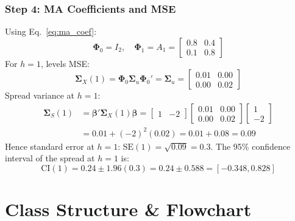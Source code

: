 \documentclass[10pt,a4paper,twocolumn]{article}
\newcommand{\bbeta}{\boldsymbol{\beta}}
\newcommand{\bSigma}{\boldsymbol{\Sigma}}
\newcommand{\bPhi}{\boldsymbol{\Phi}}
\begin{document}
\subsubsection{Step 4: MA Coefficients and MSE}
Using Eq.~\eqref{eq:ma_coef}:
\[
  \bPhi_0 = I_2, \quad \bPhi_1 = A_1 = \begin{bmatrix} 0.8 & 0.4 \\ 0.1 & 0.8 \end{bmatrix}
\]
For $h=1$, levels MSE:
\[
  \bSigma_X(1) = \bPhi_0 \bSigma_u \bPhi_0' = \bSigma_u = \begin{bmatrix} 0.01 & 0.00 \\ 0.00 & 0.02 \end{bmatrix}
\]
Spread variance at $h=1$:
\begin{align*}
  \bSigma_S(1) &= \bbeta' \bSigma_X(1) \bbeta = \begin{bmatrix} 1 & -2 \end{bmatrix} \begin{bmatrix} 0.01 & 0.00 \\ 0.00 & 0.02 \end{bmatrix} \begin{bmatrix} 1 \\ -2 \end{bmatrix} \\
               &= 0.01 + (-2)^2(0.02) = 0.01 + 0.08 = 0.09
\end{align*}
Hence standard error at $h=1$: $\text{SE}(1) = \sqrt{0.09} = 0.3$.
The 95\% confidence interval of the spread at $h=1$ is:
\[
  \text{CI}(1) = 0.24 \pm 1.96(0.3) = 0.24 \pm 0.588 = [-0.348, 0.828]
\]

\section{Class Structure \& Flowchart}
\end{document}
